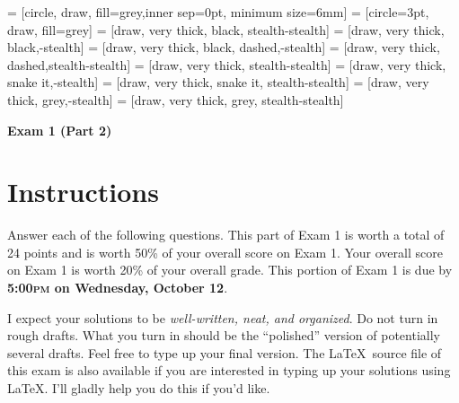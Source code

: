 \documentclass[11pt]{article}
\theoremstyle{definition}
\begin{document}
 = [circle, draw, fill=grey,inner sep=0pt, minimum size=6mm]
 = [circle=3pt, draw, fill=grey]
 = [draw, very  thick, black, stealth-stealth]
 = [draw, very  thick, black,-stealth]
 = [draw, very  thick, black, dashed,-stealth]
 = [draw, very thick, dashed,stealth-stealth]
 = [draw, very thick, stealth-stealth]
 = [draw, very thick, snake it,-stealth]
 = [draw, very thick, snake it, stealth-stealth]
 = [draw, very thick, grey,-stealth]
 = [draw, very thick, grey, stealth-stealth]

\begin{center}

{\Large\bf Exam 1 (Part 2)}

\bigskip

  
  \bigskip
  

\end{center}

\section*{Instructions}

Answer each of the following questions. This part of Exam 1 is worth a total of 24 points and is worth 50\% of your overall score on Exam 1. Your overall score on Exam 1 is worth 20\% of your overall grade. This portion of Exam 1 is due by \textbf{5:00\textsc{pm} on Wednesday, October 12}.

\bigskip

I expect your solutions to be \emph{well-written, neat, and organized}.  Do not turn in rough drafts.  What you turn in should be the ``polished'' version of potentially several drafts.  Feel free to type up your final version.  The \LaTeX\ source file of this exam is also available if you are interested in typing up your solutions using \LaTeX.  I'll gladly help you do this if you'd like.

\bigskip
\end{document}
